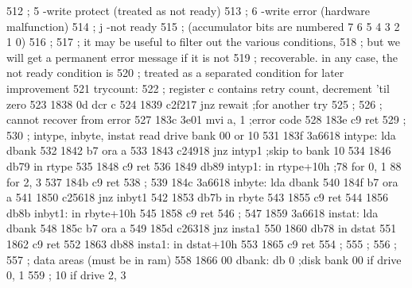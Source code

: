 512                       ;        5        -write protect (treated as not ready)
513                       ;        6        -write error (hardware malfunction)
514                       ;        j        -not ready
515                       ;        (accumulator bits are numbered 7 6 5 4 3 2 1 0)
516                       ;
517                       ;        it may be useful to filter out the various conditions,
518                       ;        but we will get a permanent error message if it is not
519                       ;        recoverable.  in any case, the not ready condition is
520                       ;        treated as a separated condition for later improvement
521                       trycount:
522                       ;        register c contains retry count, decrement 'til zero
523      1838 0d                   dcr      c
524      1839 c2f217               jnz      rewait     ;for another try
525                       ;
526                       ;        cannot recover from error
527      183c 3e01                 mvi      a, 1       ;error code
528      183e c9                   ret
529                       ;
530                       ;        intype, inbyte, instat read drive bank 00 or 10
531      183f 3a6618      intype:  lda      dbank
532      1842 b7                   ora      a
533      1843 c24918               jnz      intyp1     ;skip to bank 10
534      1846 db79                 in       rtype
535      1848 c9                   ret
536      1849 db89        intyp1:  in       rtype+10h        ;78 for 0, 1 88 for 2, 3
537      184b c9                   ret
538                       ;
539      184c 3a6618      inbyte:  lda      dbank
540      184f b7                   ora      a
541      1850 c25618               jnz      inbyt1
542      1853 db7b                 in       rbyte
543      1855 c9                   ret
544      1856 db8b        inbyt1:  in       rbyte+10h
545      1858 c9                   ret
546                       ;
547      1859 3a6618      instat:  lda      dbank
548      185c b7                   ora      a
549      185d c26318               jnz      insta1
550      1860 db78                 in       dstat
551      1862 c9                   ret
552      1863 db88        insta1:  in       dstat+10h
553      1865 c9                   ret
554                       ;
555                       ;
556                       ;
557                       ;        data areas (must be in ram)
558      1866 00          dbank:   db       0          ;disk bank 00 if drive 0, 1
559                                                    ;          10 if drive 2, 3
